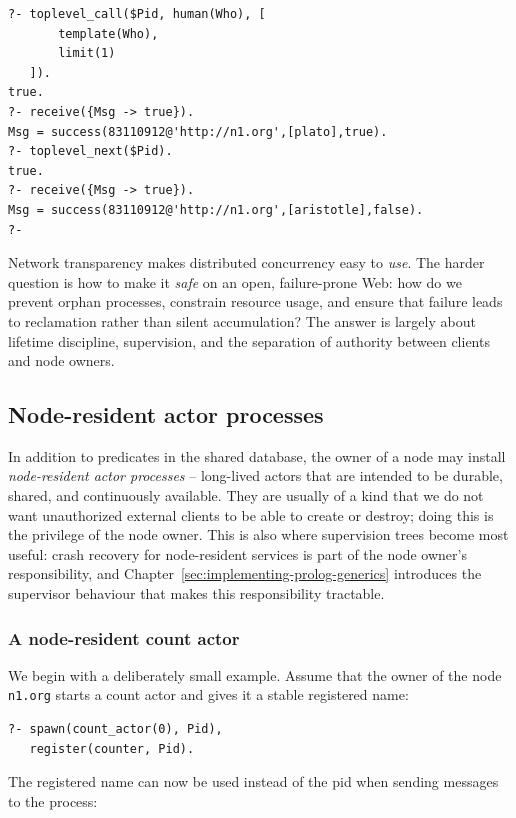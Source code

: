 \begin{verbatim}
?- toplevel_call($Pid, human(Who), [
       template(Who),
       limit(1)
   ]).
true.
?- receive({Msg -> true}).
Msg = success(83110912@'http://n1.org',[plato],true).
?- toplevel_next($Pid).
true.
?- receive({Msg -> true}).
Msg = success(83110912@'http://n1.org',[aristotle],false).
?-
\end{verbatim}

\noindent Network transparency makes distributed concurrency easy to \emph{use}. The harder question is how to make it \textit{safe} on an open, failure-prone Web: how do we prevent orphan processes, constrain resource usage, and ensure that failure leads to reclamation rather than silent accumulation? The answer is largely about lifetime discipline, supervision, and the separation of authority between clients and node owners.

\subsection{Node-resident actor processes}\label{sec:node-resident-actors}

In addition to predicates in the shared database, the owner of a
node may install \textit{node-resident actor processes} -- long-lived
actors that are intended to be durable, shared, and continuously
available. They are usually of a kind that we do not want
unauthorized external clients to be able to create or destroy; doing
this is the privilege of the node owner. This is also where supervision trees become most useful: crash recovery for node-resident services is part of the node owner's responsibility, and Chapter~\ref{sec:implementing-prolog-generics} introduces the supervisor behaviour that makes this responsibility tractable.


\subsubsection{A node-resident count actor}

We begin with a deliberately small example. Assume that the owner of the node \texttt{n1.org} starts a count actor and gives it a stable registered name:

\begin{verbatim}
?- spawn(count_actor(0), Pid),
   register(counter, Pid).
\end{verbatim}

\noindent The registered name can now be used instead of the pid when sending messages to the process:

